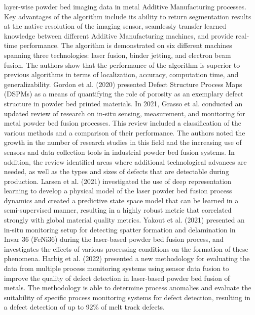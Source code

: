 layer-wise powder bed imaging data in metal Additive Manufacturing processes. Key advantages of the algorithm include its ability to return segmentation results at the native resolution of the imaging sensor, seamlessly transfer learned knowledge between different Additive Manufacturing machines, and provide real-time performance. The algorithm is demonstrated on six different machines spanning three technologies: laser fusion, binder jetting, and electron beam fusion. The authors show that the performance of the algorithm is superior to previous algorithms in terms of localization, accuracy, computation time, and generalizability. Gordon et al. (2020)\nocite{gordon2020defect} presented Defect Structure Process Maps (DSPMs) as a means of quantifying the role of porosity as an exemplary defect structure in powder bed printed materials. In 2021, Grasso et al. \nocite{grasso2021situ} conducted an updated review of research on in-situ sensing, measurement, and monitoring for metal powder bed fusion processes. This review included a classification of the various methods and a comparison of their performance. The authors noted the growth in the number of research studies in this field and the increasing use of sensors and data collection tools in industrial powder bed fusion systems. In addition, the review identified areas where additional technological advances are needed, as well as the types and sizes of defects that are detectable during production. Larsen et al. (2021) \nocite{larsen2022deep} investigated the use of deep representation learning to develop a physical model of the laser powder bed fusion process dynamics and created a predictive state space model that can be learned in a semi-supervised manner, resulting in a highly robust metric that correlated strongly with global material quality metrics. Yakout et al. (2021) \nocite{yakout2021situ} presented an in-situ monitoring setup for detecting spatter formation and delamination in Invar 36 (FeNi36) during the laser-based powder bed fusion process, and investigates the effects of various processing conditions on the formation of these phenomena. Harbig et al. (2022) presented a new methodology for evaluating the data from multiple process monitoring systems using sensor data fusion to improve the quality of defect detection in laser-based powder bed fusion of metals. The methodology is able to determine process anomalies and evaluate the suitability of specific process monitoring systems for defect detection, resulting in a defect detection of up to 92\% of melt track defects.\\
